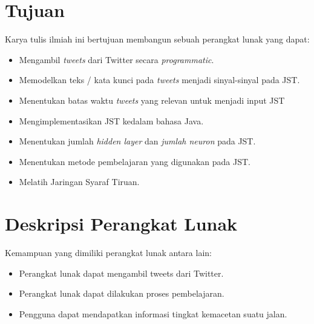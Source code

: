 \documentclass[a4paper,twoside]{article}
\begin{document}
\section{Tujuan}
Karya tulis ilmiah ini bertujuan membangun sebuah perangkat lunak yang dapat:
\begin{itemize}
	\item Mengambil \textit{tweets} dari Twitter secara \textit{programmatic}.
	\item Memodelkan teks / kata kunci pada \textit{tweets} menjadi sinyal-sinyal pada JST.
	\item Menentukan batas waktu \textit{tweets} yang relevan untuk menjadi input JST
	\item Mengimplementasikan JST kedalam bahasa Java.
	\item Menentukan jumlah \textit{hidden layer} dan \textit{jumlah neuron} pada JST.
	\item Menentukan metode pembelajaran yang digunakan pada JST.
	\item Melatih Jaringan Syaraf Tiruan.
\end{itemize}
\section{Deskripsi Perangkat Lunak}
Kemampuan yang dimiliki perangkat lunak antara lain:
\begin{itemize}	
	\item Perangkat lunak dapat mengambil tweets dari Twitter.
	\item Perangkat lunak dapat dilakukan proses pembelajaran.
	\item Pengguna dapat mendapatkan informasi tingkat kemacetan suatu jalan.
\end{itemize}
\end{document}
